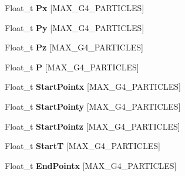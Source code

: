 \begin{DoxyCompactItemize}
\item 
\hypertarget{classanatree_a81331574efd57def158e542793f3d8bf}{Float\-\_\-t {\bfseries Px} \mbox{[}M\-A\-X\-\_\-\-G4\-\_\-\-P\-A\-R\-T\-I\-C\-L\-E\-S\mbox{]}}\label{classanatree_a81331574efd57def158e542793f3d8bf}

\item 
\hypertarget{classanatree_a609f4c90a9506ef21de3159e319c85d9}{Float\-\_\-t {\bfseries Py} \mbox{[}M\-A\-X\-\_\-\-G4\-\_\-\-P\-A\-R\-T\-I\-C\-L\-E\-S\mbox{]}}\label{classanatree_a609f4c90a9506ef21de3159e319c85d9}

\item 
\hypertarget{classanatree_a98146831ad9d99b688d08e79188e0fac}{Float\-\_\-t {\bfseries Pz} \mbox{[}M\-A\-X\-\_\-\-G4\-\_\-\-P\-A\-R\-T\-I\-C\-L\-E\-S\mbox{]}}\label{classanatree_a98146831ad9d99b688d08e79188e0fac}

\item 
\hypertarget{classanatree_acfe26310d0c515b4c134369b5ff46f63}{Float\-\_\-t {\bfseries P} \mbox{[}M\-A\-X\-\_\-\-G4\-\_\-\-P\-A\-R\-T\-I\-C\-L\-E\-S\mbox{]}}\label{classanatree_acfe26310d0c515b4c134369b5ff46f63}

\item 
\hypertarget{classanatree_a041ab7cfe95cade96ea8fd8ebfec8e04}{Float\-\_\-t {\bfseries Start\-Pointx} \mbox{[}M\-A\-X\-\_\-\-G4\-\_\-\-P\-A\-R\-T\-I\-C\-L\-E\-S\mbox{]}}\label{classanatree_a041ab7cfe95cade96ea8fd8ebfec8e04}

\item 
\hypertarget{classanatree_a19c3d65921e88454edf675b7ef648d68}{Float\-\_\-t {\bfseries Start\-Pointy} \mbox{[}M\-A\-X\-\_\-\-G4\-\_\-\-P\-A\-R\-T\-I\-C\-L\-E\-S\mbox{]}}\label{classanatree_a19c3d65921e88454edf675b7ef648d68}

\item 
\hypertarget{classanatree_a8d0f9bdc3a3d47ccbfb3857bb57de1b9}{Float\-\_\-t {\bfseries Start\-Pointz} \mbox{[}M\-A\-X\-\_\-\-G4\-\_\-\-P\-A\-R\-T\-I\-C\-L\-E\-S\mbox{]}}\label{classanatree_a8d0f9bdc3a3d47ccbfb3857bb57de1b9}

\item 
\hypertarget{classanatree_a857e3299b2bd858b49c59e0c7e34335a}{Float\-\_\-t {\bfseries Start\-T} \mbox{[}M\-A\-X\-\_\-\-G4\-\_\-\-P\-A\-R\-T\-I\-C\-L\-E\-S\mbox{]}}\label{classanatree_a857e3299b2bd858b49c59e0c7e34335a}

\item 
\hypertarget{classanatree_a936465e0097b348ae7cef814d430cbaa}{Float\-\_\-t {\bfseries End\-Pointx} \mbox{[}M\-A\-X\-\_\-\-G4\-\_\-\-P\-A\-R\-T\-I\-C\-L\-E\-S\mbox{]}}\label{classanatree_a936465e0097b348ae7cef814d430cbaa}


\end{DoxyCompactItemize}
